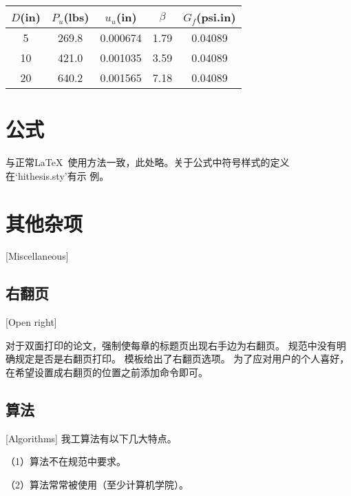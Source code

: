 \begin{table}[p]
	\centering
	\begin{sideways}
		\begin{minipage}{\textheight}
			\vspace{0.5em}\centering\wuhao
			\begin{tabular}{ccccc}
				\toprule
				$D$(in) & $P_u$(lbs) & $u_u$(in) & $\beta$ & $G_f$(psi.in) \\
				\midrule
				5       & 269.8      & 0.000674  & 1.79    & 0.04089       \\
				10      & 421.0      & 0.001035  & 3.59    & 0.04089       \\
				20      & 640.2      & 0.001565  & 7.18    & 0.04089       \\
				\bottomrule
			\end{tabular}
		\end{minipage}
	\end{sideways}
\end{table}


\section{公式}
与正常\LaTeX\ 使用方法一致，此处略。关于公式中符号样式的定义在`hithesis.sty'有示
例。

\section{其他杂项}[Miscellaneous]

\subsection{右翻页}[Open right]

对于双面打印的论文，强制使每章的标题页出现右手边为右翻页。
规范中没有明确规定是否是右翻页打印。
模板给出了右翻页选项。
为了应对用户的个人喜好，在希望设置成右翻页的位置之前添加命令即可。

\subsection{算法}[Algorithms]
我工算法有以下几大特点。

（1）算法不在规范中要求。

（2）算法常常被使用（至少计算机学院）。


